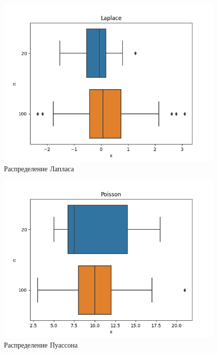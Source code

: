 \documentclass[12pt]{article}
\begin{document}
\begin{figure}
  \centering
  \includegraphics[width=0.4\paperwidth ]{images/boxplots/Laplace.png}
  \caption{Распределение Лапласа}
\end{figure}

\begin{figure}
  \centering
  \includegraphics[width=0.4\paperwidth ]{images/boxplots/Poisson.png}
  \caption{Распределение Пуассона}
\end{figure}
\end{document}
